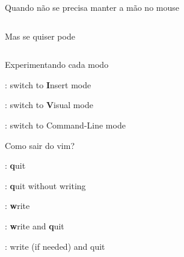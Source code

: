 \begin{frame}{Quando não se precisa manter a mão no mouse}
\begin{columns}
        \begin{column}{0.3\textwidth}
            \begin{widedescription}
                \item Mas se quiser pode
                \item {}
            \end{widedescription}
        \end{column}
    \end{columns}
\end{frame}

\begin{frame}{Experimentando cada modo}
    \begin{wideitemize}
        \item {}: switch to \textbf{I}nsert mode
        \item {}: switch to \textbf{V}isual mode
        \item \key{:}: switch to Command-Line mode
    \end{wideitemize}
\end{frame}

\begin{frame}{Como sair do vim?}
    \begin{widedescription}
        \item {}: \textbf{q}uit
        \item {}: \textbf{q}uit without writing
        \item {}: \textbf{w}rite
        \item {}: \textbf{w}rite and \textbf{q}uit
        \item {}: write (if needed) and quit
    \end{widedescription}
\end{frame}